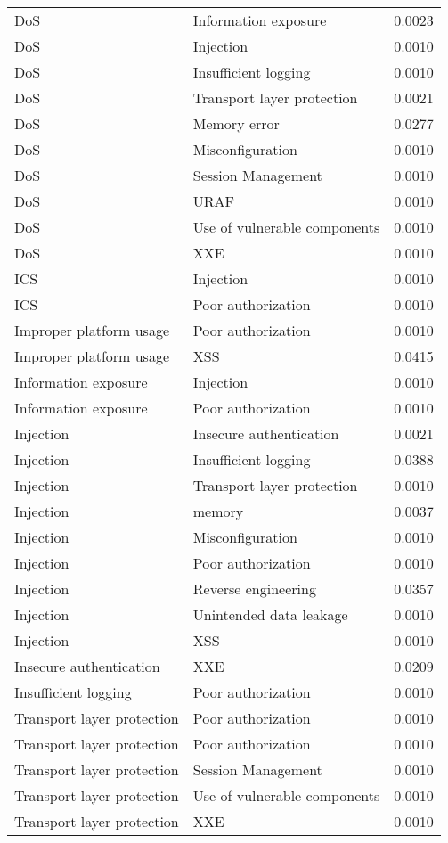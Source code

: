 {\begin{longtable}{lll}
DoS & Information exposure & 0.0023\\
DoS & Injection & 0.0010\\
DoS & Insufficient logging & 0.0010\\
DoS & Transport layer protection & 0.0021\\
DoS & Memory error & 0.0277\\
DoS & Misconfiguration & 0.0010\\
DoS & Session Management & 0.0010\\
DoS & URAF & 0.0010\\
DoS & Use of vulnerable components & 0.0010\\
DoS & XXE & 0.0010\\
ICS & Injection & 0.0010\\
ICS & Poor authorization & 0.0010\\
Improper platform usage & Poor authorization & 0.0010\\
Improper platform usage & XSS & 0.0415\\
Information exposure & Injection & 0.0010\\
Information exposure & Poor authorization & 0.0010\\
Injection & Insecure authentication & 0.0021\\
Injection & Insufficient logging & 0.0388\\
Injection & Transport layer protection & 0.0010\\
Injection & memory & 0.0037\\
Injection & Misconfiguration & 0.0010\\
Injection & Poor authorization & 0.0010\\
Injection & Reverse engineering & 0.0357\\
Injection & Unintended data leakage & 0.0010\\
Injection & XSS & 0.0010\\
Insecure authentication & XXE & 0.0209\\
Insufficient logging & Poor authorization & 0.0010\\
Transport layer protection & Poor authorization & 0.0010\\
Transport layer protection & Poor authorization & 0.0010\\
Transport layer protection & Session Management & 0.0010\\
Transport layer protection & Use of vulnerable components & 0.0010\\
Transport layer protection & XXE & 0.0010\\

\end{longtable}}
